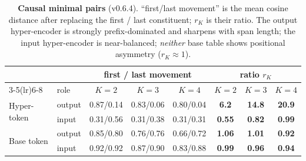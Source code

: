 \begin{table}[t]
\centering\small
\begin{tabular}{ll ccc ccc}
\toprule
& & \multicolumn{3}{c}{first / last movement} & \multicolumn{3}{c}{ratio $r_K$} \\
\cmidrule(lr){3-5}\cmidrule(lr){6-8}
& role & $K{=}2$ & $K{=}3$ & $K{=}4$ & $K{=}2$ & $K{=}3$ & $K{=}4$ \\
\midrule
\multirow{2}{*}{Hyper-token}
 & output & 0.87/0.14 & 0.83/0.06 & 0.80/0.04 & \textbf{6.2} & \textbf{14.8} & \textbf{20.9} \\
 & input  & 0.31/0.56 & 0.31/0.38 & 0.31/0.31 & \textbf{0.55} & \textbf{0.82} & \textbf{0.99} \\
\midrule
\multirow{2}{*}{Base token}
 & output & 0.85/0.80 & 0.76/0.76 & 0.66/0.72 & \textbf{1.06} & \textbf{1.01} & \textbf{0.92} \\
 & input  & 0.92/0.92 & 0.87/0.90 & 0.83/0.88 & \textbf{0.99} & \textbf{0.96} & \textbf{0.94} \\
\bottomrule
\end{tabular}
\vspace{4pt}
\caption{\textbf{Causal minimal pairs} (v0.6.4). ``first/last movement'' is the
mean cosine distance after replacing the first / last constituent; $r_K$ is their
ratio. The output hyper-encoder is strongly prefix-dominated and sharpens with
span length; the input hyper-encoder is near-balanced; \emph{neither} base table
shows positional asymmetry ($r_K\!\approx\!1$).}
\label{tab:minimal-pairs}
\end{table}

